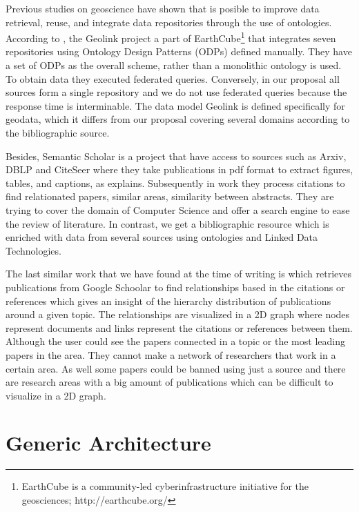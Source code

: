 \documentclass[11pt]{article}
\begin{document}
Previous studies on geoscience have shown that is posible to improve data retrieval, reuse, and integrate data repositories through the use of ontologies. According to 
\cite{Krisnadhi2015TheGF}, the Geolink project a part of EarthCube\footnote{EarthCube is a community-led cyberinfrastructure initiative for the geosciences; http://earthcube.org/}  that integrates seven repositories using Ontology Design Patterns (ODPs) \cite{Gangemi2005} defined manually.  They have a set of ODPs as the overall scheme, rather than a monolithic ontology is used. To obtain data they executed federated queries. Conversely, in our proposal all sources form a single repository and we do not use federated queries because the response time is  interminable. The data model Geolink is defined specifically for geodata, which it differs from our proposal covering several domains according to the bibliographic source.

Besides, Semantic Scholar is a project that have access to sources such as Arxiv, DBLP and CiteSeer  where they take publications in pdf format to extract figures, tables, and captions, as \cite{eps271285} explains. Subsequently in  \cite{AAAIW1510092} work they process citations to find relationated papers, similar areas, similarity between abstracts. They are trying to cover the domain of Computer Science and offer a search engine to ease the review of literature. In contrast, we get  a bibliographic resource which is enriched with data from several sources using ontologies and Linked Data Technologies.

The last similar work that we have found at the time of writing is \cite{Alfraidi} which retrieves publications from Google Schoolar to find relationships based in the citations or references which gives an insight of the hierarchy distribution of publications around a given topic. The relationships are visualized in a 2D graph where nodes represent documents and links represent the citations or references between them. Although the user could see the papers connected in a topic or the most leading papers in the area. They cannot make a network of researchers that work in a  certain area. As well some papers could be banned using just a source and there are research areas with a big amount of publications which can be difficult to visualize in a 2D graph. 

\section{Generic Architecture}
\label{label:arch}
\end{document}
